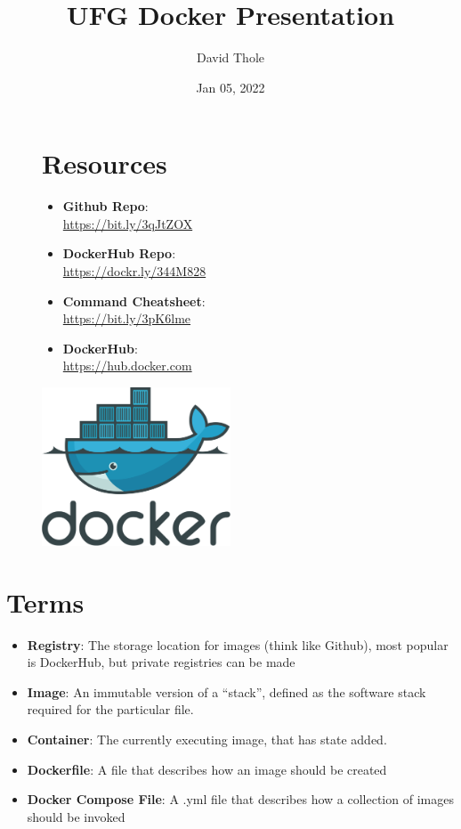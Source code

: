 \documentclass[legal,12pt,oneside,pdflatex,final,twocolumn]{article}
\title{UFG Docker Presentation}
\author{David Thole}
\date{Jan 05, 2022}
\begin{document}
\pagestyle{fancy}


\onecolumn

\begin{figure}
\begin{minipage}{0.47\textwidth}
\section{Resources}
    \begin{itemize}
        \item \textbf{Github Repo}: \\ \url{https://bit.ly/3qJtZOX}
        \item \textbf{DockerHub Repo}: \\ \url{https://dockr.ly/344M828}
        \item \textbf{Command Cheatsheet}: \\ \url{https://bit.ly/3pK6lme}
        \item \textbf{DockerHub}: \\ \url{https://hub.docker.com}
    \end{itemize}
\end{minipage}
\hfill
\begin{minipage}{0.47\textwidth}
  \centering
  \includegraphics[width=0.5\textwidth,right]{XX-DockerLogo.png}
\end{minipage}
\end{figure}

\section{Terms}
\begin{itemize}
  \item \textbf{Registry}: The storage location for images (think like Github), most popular is DockerHub, but private registries can be made
  \item \textbf{Image}: An immutable version of a ``stack'', defined as the software stack required for the particular file.
  \item \textbf{Container}: The currently executing image, that has state added.
  \item \textbf{Dockerfile}: A file that describes how an image should be created
  \item \textbf{Docker Compose File}: A .yml file that describes how a collection of images should be invoked
\end{itemize}
\end{document}
